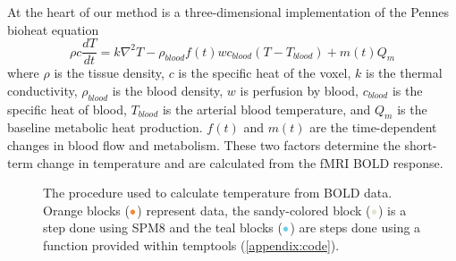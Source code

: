   At the heart of our method is a three-dimensional implementation of the Pennes bioheat equation
    \begin{equation} 
    \label{eq:3dbioheat} 
    	\rho c \frac{dT}{dt} = k \nabla^{2}T-\rho_{blood}f(t)wc_{blood}(T-T_{blood})+m(t)Q_{m} 
    \end{equation}
  where $\rho$ is the tissue density, $c$ is the specific heat of the voxel, $k$ is the thermal conductivity, $\rho_{blood}$ is the blood density, $w$ is perfusion by blood, $c_{blood}$ is the specific heat of blood, $T_{blood}$ is the arterial blood temperature, and $Q_{m}$ is the baseline metabolic heat production. $f(t)$ and $m(t)$ are the time-dependent changes in blood flow and metabolism. These two factors determine the short-term change in temperature and are calculated from the fMRI BOLD response.
  \begin{figure}[tb]
    \caption[Procedure used to calculate temperature change]{\label{fig:procedureflowchart} The procedure used to calculate temperature from BOLD data.  Orange blocks ($\color{goldfish}\bullet$) represent data, the sandy-colored block ($\color{beachstorm}\bullet$) is a step done using SPM8 and the teal blocks ($\color{aoi}\bullet$) are steps done using a function provided within temptools (\cref{appendix:code}).}
    \vspace{10pt}
    \centering
    
  \end{figure}
  
